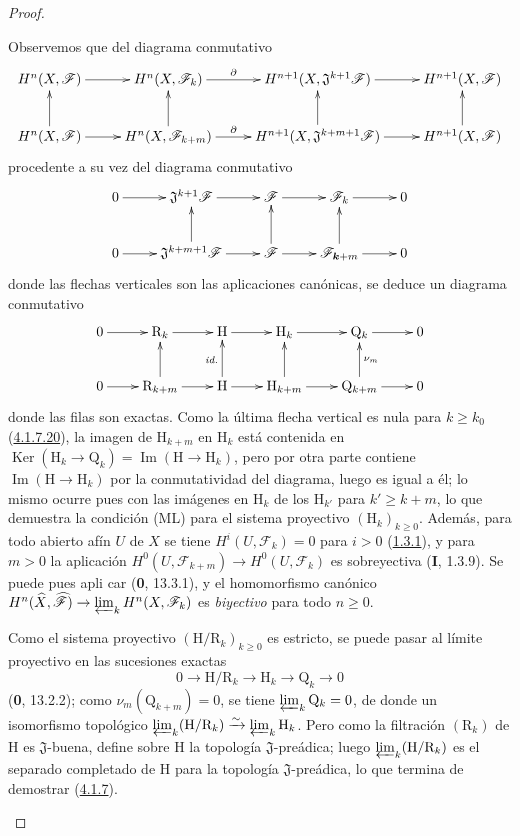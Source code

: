 \begin{proof}
\begin{env}[4.1.7.21]
\label{III.4.1.7.21-fr}
Observemos que del diagrama conmutativo
\[
\xymatrix@C=2.5em{
H^n(X,\mathcal F)\ar[r]&H^n(X,\mathcal F_k)\ar[r]^-\partial&
H^{n+1}(X,\mathfrak J^{k+1}\mathcal F)\ar[r]&H^{n+1}(X,\mathcal F)\\
H^n(X,\mathcal F)\ar[r]\ar[u]&H^n(X,\mathcal F_{k+m})\ar[r]^-\partial\ar[u]&
H^{n+1}(X,\mathfrak J^{k+m+1}\mathcal F)\ar[r]\ar[u]&
H^{n+1}(X,\mathcal F)\ar[u]
}
\]
procedente a su vez del diagrama conmutativo
\[
\xymatrix{
0\ar[r]&\mathfrak J^{k+1}\mathcal F\ar[r]&\mathcal F\ar[r]&
\mathcal F_k\ar[r]&0\\
0\ar[r]&\mathfrak J^{k+m+1}\mathcal F\ar[r]\ar[u]&
\mathcal F\ar[r]\ar[u]&\mathcal F_{\boldsymbol{k}+m}\ar[r]\ar[u]&0
}
\]
donde las flechas verticales son las aplicaciones canónicas, se deduce un
diagrama conmutativo
\[
\xymatrix@C=2.2em{
0\ar[r]&\mathrm R_k\ar[r]&\mathrm H\ar[r]&\mathrm H_k\ar[r]&
\mathrm Q_k\ar[r]&0\\
0\ar[r]&\mathrm R_{k+m}\ar[r]\ar[u]&\mathrm H\ar[r]\ar[u]^{\textit{id.}}&
\mathrm H_{k+m}\ar[r]\ar[u]&\mathrm Q_{k+m}\ar[r]\ar[u]_{\nu_m}&0
}
\]
donde las filas son exactas. Como la última flecha vertical es nula
para $k\geq k_0$ (\hyperref[III.4.1.7.20-fr]{4.1.7.20}), la imagen de
$\mathrm H_{k+m}$ en $\mathrm H_k$ está contenida en
$\operatorname{Ker}(\mathrm H_k\to\mathrm Q_k)
=\operatorname{Im}(\mathrm H\to\mathrm H_k)$, pero por otra parte
contiene $\operatorname{Im}(\mathrm H\to\mathrm H_k)$ por la conmutatividad
del diagrama, luego es igual a él; lo mismo ocurre pues con las imágenes
en $\mathrm H_k$ de los $\mathrm H_{k'}$ para $k'\geq k+m$, lo que demuestra
la condición (ML) para el sistema proyectivo $(\mathrm H_k)_{k\geq0}$. Además,
para todo abierto afín $U$ de $X$ se tiene
$H^i(U,\mathcal F_k)=0$ para $i>0$
(\hyperref[III.1.3.1-fr]{1.3.1}), y para $m>0$ la aplicación
$H^0(U,\mathcal F_{k+m})\to H^0(U,\mathcal F_k)$ es sobreyectiva
(\textbf{I}, 1.3.9). Se puede pues apli%
car (\textbf{0}, 13.3.1), y el homomorfismo canónico
$H^n(\widehat X,\widehat{\mathcal F})\to
\varprojlim_kH^n(X,\mathcal F_k)$ es \emph{biyectivo} para todo $n\geq0$.

Como el sistema proyectivo $(\mathrm H/\mathrm R_k)_{k\geq0}$ es estricto,
se puede pasar al límite proyectivo en las sucesiones exactas
\[
0\longrightarrow\mathrm H/\mathrm R_k\longrightarrow\mathrm H_k
\longrightarrow\mathrm Q_k\longrightarrow0
\tag{4.1.7.22}\label{III.4.1.7.22-fr}
\]
(\textbf{0}, 13.2.2); como $\nu_m(\mathrm Q_{k+m})=0$, se tiene
$\varprojlim_k\mathrm Q_k=0$, de donde un isomorfismo topológico
$\varprojlim_k(\mathrm H/\mathrm R_k)\xrightarrow{\sim}
\varprojlim_k\mathrm H_k$.
Pero como la filtración $(\mathrm R_k)$ de $\mathrm H$ es
$\mathfrak J$-buena, define sobre $\mathrm H$ la topología
$\mathfrak J$-preádica; luego $\varprojlim_k(\mathrm H/\mathrm R_k)$ es
el separado completado de $\mathrm H$ para la topología
$\mathfrak J$-preádica, lo que termina de demostrar
(\hyperref[III.4.1.7-fr]{4.1.7}).
\end{env}
\end{proof}

